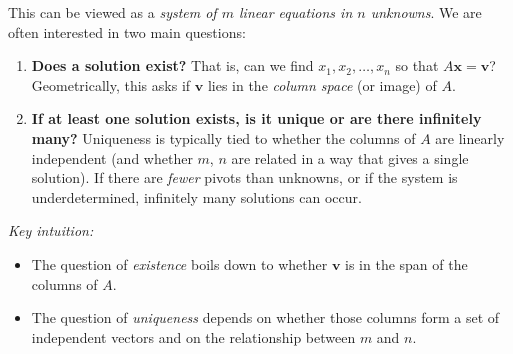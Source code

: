 \documentclass{report}
\begin{document}
This can be viewed as a \emph{system of \(m\) linear equations in \(n\) unknowns}. We are often interested in two main questions:

\begin{enumerate}
	\item \textbf{Does a solution exist?}
	      That is, can we find \(x_1, x_2, \dots, x_n\) so that \(A\mathbf{x} = \mathbf{v}\)?
	      Geometrically, this asks if \(\mathbf{v}\) lies in the \emph{column space} (or image) of \(A\).

	\item \textbf{If at least one solution exists, is it unique or are there infinitely many?}
	      Uniqueness is typically tied to whether the columns of \(A\) are linearly independent (and whether \(m\), \(n\) are related in a way that gives a single solution).  If there are \emph{fewer} pivots than unknowns, or if the system is underdetermined, infinitely many solutions can occur.
\end{enumerate}

\vspace{1em}
\noindent
\textit{Key intuition:}
\begin{itemize}
	\item The question of \emph{existence} boils down to whether \(\mathbf{v}\) is in the span of the columns of \(A\).
	\item The question of \emph{uniqueness} depends on whether those columns form a set of independent vectors and on the relationship between \(m\) and \(n\).
\end{itemize}
\end{document}
